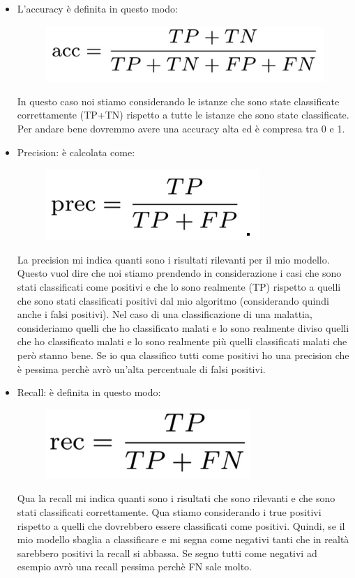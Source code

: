 \documentclass[14pt]{extreport}
\begin{document}
\begin{itemize}
	\item L’accuracy è definita in questo modo:
	      \begin{figure}[H]
		      \centering
		      \includegraphics[width=0.7\linewidth]{457.jpeg}
	      \end{figure}
	      In questo caso noi stiamo considerando le istanze che sono state classificate correttamente (TP+TN) rispetto a tutte le istanze che sono
	      state classificate. Per andare bene dovremmo avere una accuracy alta ed è compresa tra 0 e 1.
	\item Precision: è calcolata come:
	      \begin{figure}[H]
		      \centering
		      \includegraphics[width=0.7\linewidth]{458.jpeg}
	      \end{figure}
	      La precision mi indica quanti sono i risultati rilevanti per il mio modello. Questo vuol dire che noi stiamo prendendo in considerazione i
	      casi che sono stati classificati come positivi e che lo sono realmente (TP) rispetto a quelli che sono stati classificati positivi dal mio
	      algoritmo (considerando quindi anche i falsi positivi). Nel caso di una classificazione di una malattia, consideriamo quelli che ho
	      classificato malati e lo sono realmente diviso quelli che ho classificato malati e lo sono realmente più quelli classificati malati che però
	      stanno bene. Se io qua classifico tutti come positivi ho una precision che è pessima perchè avrò un’alta percentuale di falsi positivi.
	\item Recall: è definita in questo modo:
	      \begin{figure}[H]
		      \centering
		      \includegraphics[width=0.7\linewidth]{459.jpeg}
	      \end{figure}
	      Qua la recall mi indica quanti sono i risultati che sono rilevanti e che sono stati classificati correttamente. Qua stiamo considerando i
	      true positivi rispetto a quelli che dovrebbero essere classificati come positivi. Quindi, se il mio modello sbaglia a classificare e mi
	      segna come negativi tanti che in realtà sarebbero positivi la recall si abbassa. Se segno tutti come negativi ad esempio avrò una recall
	      pessima perchè FN sale molto.
\end{itemize}
\end{document}
